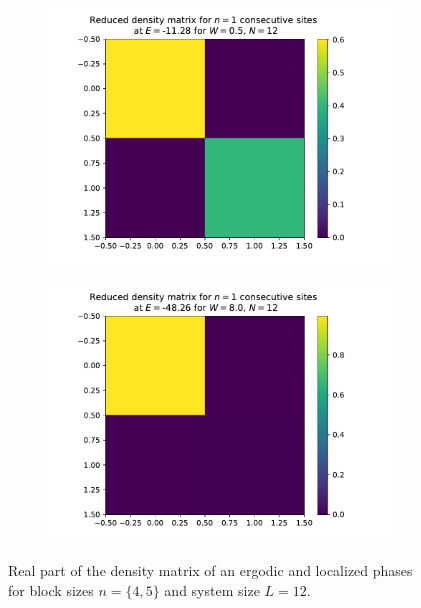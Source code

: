 \documentclass[reprint,amsmath,amssymb,aps,prb]{revtex4-2}
\begin{document}
\begin{center}
\begin{figure}[H]
\begin{subfigure}[c]{0.45\textwidth}
			\includegraphics[width=\textwidth]{../results/groundstates/N12n1_trainingset_groundstate_Wmax0.5.pdf}
		\end{subfigure}
		\begin{subfigure}[c]{0.45\textwidth}
			\includegraphics[width=\textwidth]{../results/groundstates/N12n1_trainingset_groundstate_Wmax8.0.pdf}
		\end{subfigure}
		\caption{Real part of the density matrix of an ergodic and localized phases for block sizes $n=\{4, 5\}$ and system size $L=12$.}
		\label{fig:groundstate}
	\end{figure}
\end{center}
\end{document}
